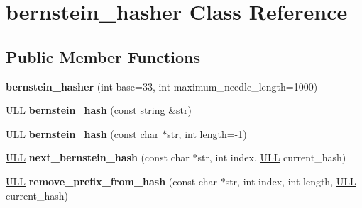 \hypertarget{classbernstein__hasher}{\section{bernstein\+\_\+hasher Class Reference}
\label{classbernstein__hasher}
}
\subsection*{Public Member Functions}
\begin{DoxyCompactItemize}
\item 
\hypertarget{classbernstein__hasher_a3000e6b57d1d8b1aa1e7eab364393b7a}{{\bfseries bernstein\+\_\+hasher} (int base=33, int maximum\+\_\+needle\+\_\+length=1000)}\label{classbernstein__hasher_a3000e6b57d1d8b1aa1e7eab364393b7a}

\item 
\hypertarget{classbernstein__hasher_a42311a7f929c57d10bdbc705c286cc3a}{\hyperlink{constants_8hpp_a114b7183aabd6c95ddb1f1cb7882cb9f}{U\+L\+L} {\bfseries bernstein\+\_\+hash} (const string \&str)}\label{classbernstein__hasher_a42311a7f929c57d10bdbc705c286cc3a}

\item 
\hypertarget{classbernstein__hasher_ab7a270a0d6761bd2fb7387554af62945}{\hyperlink{constants_8hpp_a114b7183aabd6c95ddb1f1cb7882cb9f}{U\+L\+L} {\bfseries bernstein\+\_\+hash} (const char $\ast$str, int length=-\/1)}\label{classbernstein__hasher_ab7a270a0d6761bd2fb7387554af62945}

\item 
\hypertarget{classbernstein__hasher_a1970539cbc4913cab45813084477f7c4}{\hyperlink{constants_8hpp_a114b7183aabd6c95ddb1f1cb7882cb9f}{U\+L\+L} {\bfseries next\+\_\+bernstein\+\_\+hash} (const char $\ast$str, int index, \hyperlink{constants_8hpp_a114b7183aabd6c95ddb1f1cb7882cb9f}{U\+L\+L} current\+\_\+hash)}\label{classbernstein__hasher_a1970539cbc4913cab45813084477f7c4}

\item 
\hypertarget{classbernstein__hasher_a17c1bfa779d038714196aed49251133e}{\hyperlink{constants_8hpp_a114b7183aabd6c95ddb1f1cb7882cb9f}{U\+L\+L} {\bfseries remove\+\_\+prefix\+\_\+from\+\_\+hash} (const char $\ast$str, int index, int length, \hyperlink{constants_8hpp_a114b7183aabd6c95ddb1f1cb7882cb9f}{U\+L\+L} current\+\_\+hash)}\label{classbernstein__hasher_a17c1bfa779d038714196aed49251133e}

\end{DoxyCompactItemize}
